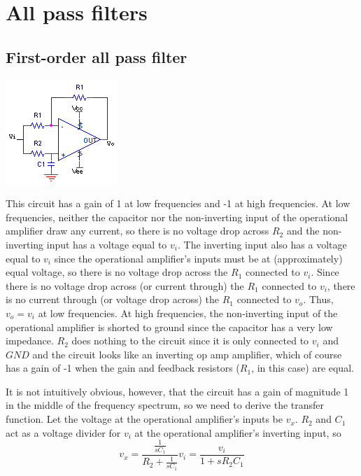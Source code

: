\section{All pass filters}
\subsection{First-order all pass filter}
\begin{center}
	\includegraphics{schematics/1storderallpassfilter.PNG}
\end{center}
This circuit \autocite[328]{op-amps-for-everyone} has a gain of 1 at low frequencies and -1 at high frequencies. At low frequencies, neither the capacitor nor the non-inverting input of the operational amplifier draw any current, so there is no voltage drop across $R_{2}$ and the non-inverting input has a voltage equal to $v_{i}$. The inverting input also has a voltage equal to $v_{i}$ since the operational amplifier's inputs must be at (approximately) equal voltage, so there is no voltage drop across the $R_{1}$ connected to $v_{i}$. Since there is no voltage drop across (or current through) the $R_{1}$ connected to $v_{i}$, there is no current through (or voltage drop across) the $R_{1}$ connected to $v_{o}$. Thus, $v_{o} = v_{i}$ at low frequencies. At high frequencies, the non-inverting input of the operational amplifier is shorted to ground since the capacitor has a very low impedance. $R_{2}$ does nothing to the circuit since it is only connected to $v_{i}$ and $GND$ and the circuit looks like an inverting op amp amplifier, which of course has a gain of -1 when the gain and feedback resistors ($R_{1}$, in this case) are equal.
\par It is not intuitively obvious, however, that the circuit has a gain of magnitude 1 in the middle of the frequency spectrum, so we need to derive the transfer function. Let the voltage at the operational amplifier's inputs be $v_{x}$. $R_{2}$ and $C_{1}$ act as a voltage divider for $v_{i}$ at the operational amplifier's inverting input, so
\begin{equation}v_{x} = \frac{\frac{1}{sC_{1}}}{R_{2}+\frac{1}{sC_{1}}}v_{i} = \frac{v_{i}}{1+sR_{2}C_{1}}
\end{equation}
